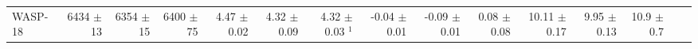\begin{sidewaystable*}[t!]
{\begin{tabular}{l r r r r r r r r r r r r r r}


WASP-18  
&  6434  $\pm$ 13 
& 6354  $\pm$ 15 
&  6400 $\pm$ 75 
&   4.47  $\pm$ 0.02 
&  4.32  $\pm$ 0.09 
& 4.32  $\pm$ 0.03 $^1$
&  -0.04  $\pm$ 0.01 
& -0.09  $\pm$ 0.01
&  0.08   $\pm$ 0.08 
&  10.11  $\pm$ 0.17 
& 9.95  $\pm$ 0.13 
&  10.9   $\pm$ 0.7 \\
 


\end{tabular}}
\end{sidewaystable*}
